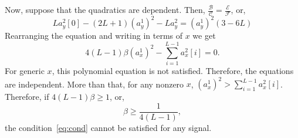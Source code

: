 \documentclass[english,11pt]{article}
\numberwithin{equation}{section}
\theoremstyle{plain}
\theoremstyle{definition}
\theoremstyle{remark}
\theoremstyle{plain}
\theoremstyle{remark}
\theoremstyle{plain}
\theoremstyle{plain}
\begin{document}
Now, suppose that the quadratics are dependent. Then, $\frac{\mathcal{B}}{\mathcal{C}} =\frac{\mathcal{E}}{\mathcal{F}} $, or, 	
\begin{equation*}
La_y^2[0] - (2L+1)(a_y^1)^2 - La_y^2 = (a_y^1)^2(3-6L)
\end{equation*}
Rearranging the equation and writing in terms of $x$ we get 
\begin{equation} \label{eq:cond}
4(L-1)\beta (a_x^1)^2  - \sum_{i=1}^{L-1} a_x^2[i] = 0.
\end{equation}	
For generic $x$,  this polynomial equation is not satisfied. Therefore,  the equations are independent. 
More than that, for any nonzero $x$, $(a_x^1)^2 >\sum_{i=1}^{L-1} a_x^2[i]$. Therefore, if $4(L-1)\beta \geq 1$, or,
\begin{equation*}
\beta \geq \frac{1}{4(L-1)},
\end{equation*}
the condition~\eqref{eq:cond} cannot be satisfied for any signal. 
\end{document}
